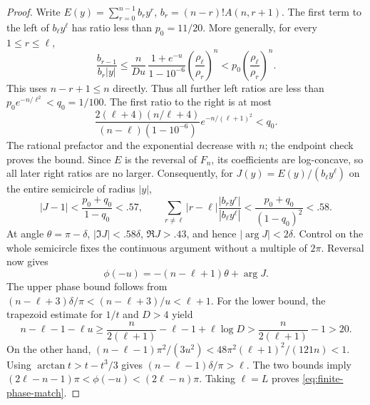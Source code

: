 \begin{proof}
Write $E(y)=\sum_{r=0}^{n-1}b_r y^r$,
$b_r=(n-r)!A(n,r+1)$. The first term to the left of $b_\ell y^\ell$ has ratio less than $p_0=11/20$. More generally, for every $1\le r\le\ell$,
\[
\frac{b_{r-1}}{b_r|y|}
\le\frac n{Du}\,\frac{1+e^{-u}}{1-10^{-6}}
       \left(\frac{\rho_\ell}{\rho_r}\right)^n
<p_0\left(\frac{\rho_\ell}{\rho_r}\right)^n.
\]
This uses $n-r+1\le n$ directly. Thus all further left ratios are less than
$p_0 e^{-n/\ell^2}<q_0=1/100$.
The first ratio to the right is at most
\[
\frac{2(\ell+4)(n/\ell+4)}{(n-\ell)(1-10^{-6})}
 e^{-n/(\ell+1)^2}<q_0.
\]
The rational prefactor and the exponential decrease with $n$; the endpoint check proves the bound. Since $E$ is the reversal of $F_n$, its coefficients are log-concave, so all later right ratios are no larger.
Consequently, for $J(y)=E(y)/(b_\ell y^\ell)$ on the entire semicircle of radius $|y|$,
\[
|J-1|<\frac{p_0+q_0}{1-q_0}<.57,\qquad
\sum_{r\ne\ell}|r-\ell|\frac{|b_r y^r|}{|b_\ell y^\ell|}
<\frac{p_0+q_0}{(1-q_0)^2}<.58.
\]
At angle $\theta=\pi-\delta$, $|\Im J|<.58\delta$, $\Re J>.43$, and hence
$|\arg J|<2\delta$. Control on the whole semicircle fixes the continuous argument without a multiple of $2\pi$. Reversal now gives
\[
\phi(-u)=-(n-\ell+1)\theta+\arg J.
\]
The upper phase bound follows from
$(n-\ell+3)\delta/\pi<(n-\ell+3)/u<\ell+1$.
For the lower bound, the trapezoid estimate for $1/t$ and $D>4$ yield
\[
n-\ell-1-\ell u
\ge\frac n{2(\ell+1)}-\ell-1+\ell\log D
>\frac n{2(\ell+1)}-1>20.
\]
On the other hand,
$(n-\ell-1)\pi^2/(3u^2)<48\pi^2(\ell+1)^2/(121n)<1$.
Using $\arctan t>t-t^3/3$ gives
$(n-\ell-1)\delta/\pi>\ell$. The two bounds imply
$(2\ell-n-1)\pi<\phi(-u)<(2\ell-n)\pi$.
Taking $\ell=L$ proves \eqref{eq:finite-phase-match}.
\end{proof}
